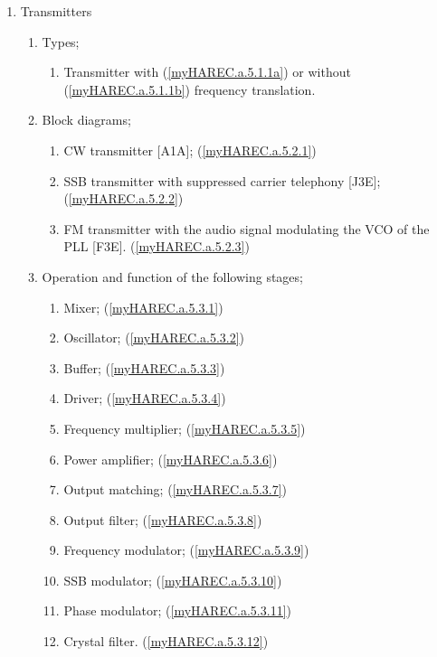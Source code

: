 \begin{enumerate}
\item Transmitters
\begin{enumerate}
\item Types;

\begin{enumerate}
\item Transmitter with (\ref{myHAREC.a.5.1.1a})\label{HAREC.a.5.1.1a}
  or without (\ref{myHAREC.a.5.1.1b})\label{HAREC.a.5.1.1b}
  frequency translation.
\end{enumerate}

\item Block diagrams;
\begin{enumerate}
\item CW transmitter [A1A]; (\ref{myHAREC.a.5.2.1})\label{HAREC.a.5.2.1}
\item SSB transmitter with suppressed carrier telephony [J3E];
  (\ref{myHAREC.a.5.2.2})\label{HAREC.a.5.2.2}
\item FM transmitter with the audio signal modulating the VCO of the PLL [F3E].
  (\ref{myHAREC.a.5.2.3})\label{HAREC.a.5.2.3}
\end{enumerate}

\item Operation and function of the following stages;
\begin{enumerate}
\item Mixer; (\ref{myHAREC.a.5.3.1})\label{HAREC.a.5.3.1}
\item Oscillator; (\ref{myHAREC.a.5.3.2})\label{HAREC.a.5.3.2}
\item Buffer; (\ref{myHAREC.a.5.3.3})\label{HAREC.a.5.3.3}
\item Driver; (\ref{myHAREC.a.5.3.4})\label{HAREC.a.5.3.4}
\item Frequency multiplier; (\ref{myHAREC.a.5.3.5})\label{HAREC.a.5.3.5}
\item Power amplifier; (\ref{myHAREC.a.5.3.6})\label{HAREC.a.5.3.6}
\item Output matching; (\ref{myHAREC.a.5.3.7})\label{HAREC.a.5.3.7}
\item Output filter; (\ref{myHAREC.a.5.3.8})\label{HAREC.a.5.3.8}
\item Frequency modulator; (\ref{myHAREC.a.5.3.9})\label{HAREC.a.5.3.9}
\item SSB modulator; (\ref{myHAREC.a.5.3.10})\label{HAREC.a.5.3.10}
\item Phase modulator; (\ref{myHAREC.a.5.3.11})\label{HAREC.a.5.3.11}
\item Crystal filter. (\ref{myHAREC.a.5.3.12})\label{HAREC.a.5.3.12}
\end{enumerate}


\end{enumerate}
\end{enumerate}
